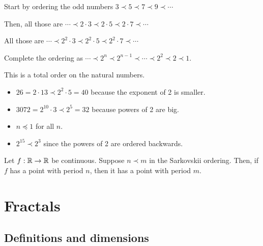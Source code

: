 \documentclass[class=pmath370,tikz,notes]{agony}
\begin{document}
\begin{defn}
  Start by ordering the odd numbers $3 \prec 5 \prec 7 \prec 9 \prec \dotsb$

  Then, all those are $\dotsb \prec 2\cdot 3 \prec 2\cdot5 \prec 2\cdot7 \prec \dotsb$

  All those are $\dotsb \prec 2^2\cdot3 \prec 2^2\cdot5 \prec 2^2\cdot7 \prec \dotsb$

  Complete the ordering as $\dotsb \prec 2^n \prec 2^{n-1} \prec \dotsb \prec 2^2 \prec 2 \prec 1$.

  This is a total order on the natural numbers.
\end{defn}

\begin{example}
  \leavevmode
  \begin{itemize}[nosep]
    \item $26 = 2\cdot 13 \prec 2^2\cdot 5 = 40$ because the exponent of 2 is smaller.
    \item $3072 = 2^{10}\cdot 3 \prec 2^5 = 32$ because powers of 2 are big.
    \item $n \preccurlyeq 1$ for all $n$.
    \item $2^{15} \prec 2^3$ since the powers of 2 are ordered backwards.
  \end{itemize}
\end{example}

\begin{theorem}
  Let $f : \mathbb{R} \to \mathbb{R}$ be continuous.
  Suppose $n \prec m$ in the Sarkovskii ordering.
  Then, if $f$ has a point with period $n$, then it has a point with period $m$.
\end{theorem}

\chapter{Fractals}

\section{Definitions and dimensions}
\end{document}

